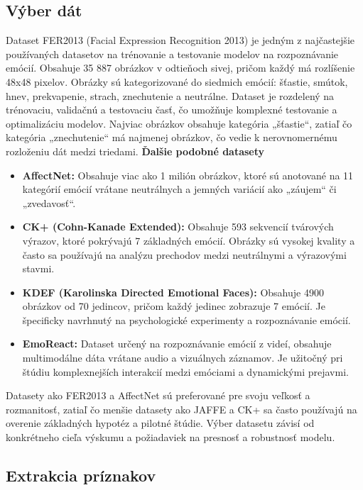 \subsection{Výber dát}
Dataset FER2013 (Facial Expression Recognition 2013) je jedným z najčastejšie používaných datasetov na trénovanie a testovanie modelov na rozpoznávanie emócií. 
Obsahuje 35 887 obrázkov v odtieňoch sivej, pričom každý má rozlíšenie 48x48 pixelov. Obrázky sú kategorizované do siedmich emócií: šťastie, smútok, hnev, 
prekvapenie, strach, znechutenie a neutrálne. Dataset je rozdelený na trénovaciu, validačnú a testovaciu časť, čo umožňuje komplexné testovanie a optimalizáciu 
modelov. Najviac obrázkov obsahuje kategória „šťastie“, zatiaľ čo kategória „znechutenie“ má najmenej obrázkov, čo vedie k nerovnomernému rozloženiu dát medzi 
triedami. \newline
\textbf{Ďalšie podobné datasety}
\begin{itemize}
    \item \textbf{AffectNet:} Obsahuje viac ako 1 milión obrázkov, ktoré sú anotované na 11 kategórií emócií vrátane neutrálnych a jemných variácií ako „záujem“ či „zvedavosť“.
    \item \textbf{CK+ (Cohn-Kanade Extended):} Obsahuje 593 sekvencií tvárových výrazov, ktoré pokrývajú 7 základných emócií. Obrázky sú vysokej kvality a často sa používajú na analýzu prechodov medzi neutrálnymi a výrazovými stavmi.
    \item \textbf{KDEF (Karolinska Directed Emotional Faces): }Obsahuje 4900 obrázkov od 70 jedincov, pričom každý jedinec zobrazuje 7 emócií. Je špecificky navrhnutý na psychologické experimenty a rozpoznávanie emócií.
    \item \textbf{EmoReact: }Dataset určený na rozpoznávanie emócií z videí, obsahuje multimodálne dáta vrátane audio a vizuálnych záznamov. Je užitočný pri štúdiu komplexnejších interakcií medzi emóciami a dynamickými prejavmi.
\end{itemize}
Datasety ako FER2013 a AffectNet sú preferované pre svoju veľkosť a rozmanitosť, zatiaľ čo menšie datasety ako JAFFE a CK+ sa často používajú na overenie 
základných hypotéz a pilotné štúdie. Výber datasetu závisí od konkrétneho cieľa výskumu a požiadaviek na presnosť a robustnosť modelu.

\subsection{Extrakcia príznakov}


